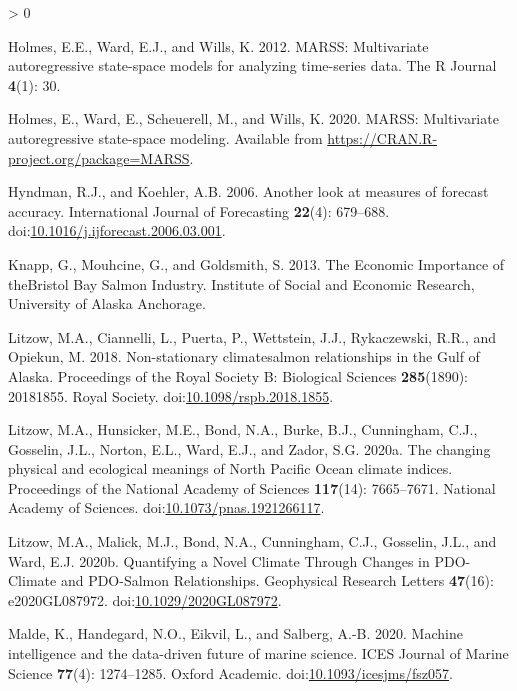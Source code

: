 \documentclass[
]{article}
\newlength{\cslhangindent}
\newenvironment{CSLReferences}[2] %
 {%
  \setlength{\parindent}{0pt}
  \ifodd #1 \everypar{\setlength{\hangindent}{\cslhangindent}}\ignorespaces\fi
  \ifnum #2 > 0
  \setlength{\parskip}{#2\baselineskip}
  \fi
 }%
 {}
\begin{document}
\begin{CSLReferences}{1}{0}
\leavevmode\hypertarget{ref-holmes2012}{}%
Holmes, E.E., Ward, E.J., and Wills, K. 2012. MARSS: Multivariate autoregressive state-space models for analyzing time-series data. The R Journal \textbf{4}(1): 30.

\leavevmode\hypertarget{ref-holmes2020}{}%
Holmes, E., Ward, E., Scheuerell, M., and Wills, K. 2020. MARSS: Multivariate autoregressive state-space modeling. Available from \url{https://CRAN.R-project.org/package=MARSS}.

\leavevmode\hypertarget{ref-hyndman2006}{}%
Hyndman, R.J., and Koehler, A.B. 2006. Another look at measures of forecast accuracy. International Journal of Forecasting \textbf{22}(4): 679--688. doi:\href{https://doi.org/10.1016/j.ijforecast.2006.03.001}{10.1016/j.ijforecast.2006.03.001}.

\leavevmode\hypertarget{ref-knapp2013}{}%
Knapp, G., Mouhcine, G., and Goldsmith, S. 2013. The {Economic Importance} of {theBristol Bay Salmon Industry}. {Institute of Social and Economic Research}, {University of Alaska Anchorage}.

\leavevmode\hypertarget{ref-litzow2018}{}%
Litzow, M.A., Ciannelli, L., Puerta, P., Wettstein, J.J., Rykaczewski, R.R., and Opiekun, M. 2018. Non-stationary climate{}salmon relationships in the {Gulf} of {Alaska}. Proceedings of the Royal Society B: Biological Sciences \textbf{285}(1890): 20181855. {Royal Society}. doi:\href{https://doi.org/10.1098/rspb.2018.1855}{10.1098/rspb.2018.1855}.

\leavevmode\hypertarget{ref-litzow2020a}{}%
Litzow, M.A., Hunsicker, M.E., Bond, N.A., Burke, B.J., Cunningham, C.J., Gosselin, J.L., Norton, E.L., Ward, E.J., and Zador, S.G. 2020a. The changing physical and ecological meanings of {North Pacific Ocean} climate indices. Proceedings of the National Academy of Sciences \textbf{117}(14): 7665--7671. {National Academy of Sciences}. doi:\href{https://doi.org/10.1073/pnas.1921266117}{10.1073/pnas.1921266117}.

\leavevmode\hypertarget{ref-litzow2020}{}%
Litzow, M.A., Malick, M.J., Bond, N.A., Cunningham, C.J., Gosselin, J.L., and Ward, E.J. 2020b. Quantifying a {Novel Climate Through Changes} in {PDO}-{Climate} and {PDO}-{Salmon Relationships}. Geophysical Research Letters \textbf{47}(16): e2020GL087972. doi:\href{https://doi.org/10.1029/2020GL087972}{10.1029/2020GL087972}.

\leavevmode\hypertarget{ref-malde2020}{}%
Malde, K., Handegard, N.O., Eikvil, L., and Salberg, A.-B. 2020. Machine intelligence and the data-driven future of marine science. ICES Journal of Marine Science \textbf{77}(4): 1274--1285. {Oxford Academic}. doi:\href{https://doi.org/10.1093/icesjms/fsz057}{10.1093/icesjms/fsz057}.


\end{CSLReferences}
\end{document}
